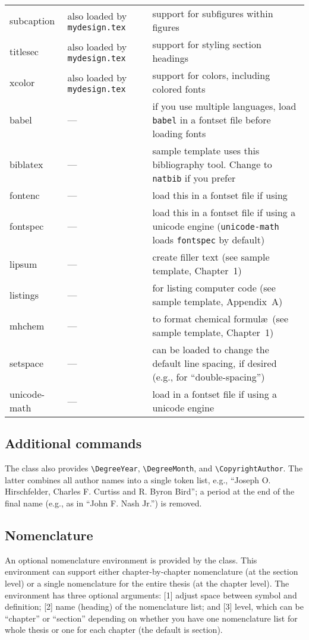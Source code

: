 \documentclass[11pt]{article}
\newcommand*\pdfTeX{\hologo{pdfTeX}}
\begin{document}
\begin{table}[t]
{\begin{tabular*}{\textwidth}{>{\ttfamily}l<{}@{\extracolsep{\fill}}p{18em} p{22em} }
subcaption & also loaded by \texttt{mydesign.tex}		& support for subfigures within figures \\
titlesec   & also loaded by \texttt{mydesign.tex} 		& support for styling section headings \\
xcolor	   & also loaded by \texttt{mydesign.tex} 		& support for colors, including colored fonts \\[0.7em]
\midrule
babel	 & --- & if you use multiple languages, load \texttt{babel} in a fontset file before loading fonts \\
biblatex & --- & sample template uses this bibliography tool. Change to \texttt{natbib} if you prefer\\
fontenc	 & --- & load this in a fontset file if using \pdfTeX\\
fontspec & --- & load this in a fontset file if using a unicode engine (\texttt{unicode-math} loads \texttt{fontspec} by default)\\
lipsum   & --- & create filler text (see sample template, Chapter~1) \\
listings & --- & for listing computer code (see sample template, Appendix~A) \\
mhchem   & --- & to format chemical formul\ae\ (see sample template, Chapter~1) \\
setspace & --- & can be loaded to change the default line spacing, if desired (e.g., for ``double-spacing'')\\
unicode-math & --- & load in a fontset file if using a unicode engine\\
\bottomrule
\end{tabular*}}%
\end{table}

\subsection*{Additional commands}
The class also provides \verb|\DegreeYear|, \verb|\DegreeMonth|, and \verb|\CopyrightAuthor|. The latter combines all author names into a single token list, e.g., ``Joseph O. Hirschfelder, Charles F. Curtiss and R. Byron Bird''; a period at the end of the final name (e.g., as in ``John F. Nash Jr.'') is removed.


\subsection*{Nomenclature}
An optional nomenclature environment is provided by the class.  This environment can support either chapter-by-chapter nomenclature (at the section level) or a single nomenclature for the entire thesis (at the chapter level). The environment has three optional arguments: [1] adjust space between symbol and definition; [2] name (heading) of the nomenclature list; and [3] level, which can be ``chapter'' or ``section'' depending on whether you
have one nomenclature list for whole thesis or one for each chapter (the default is section). 
\end{document}
